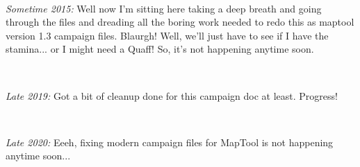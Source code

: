 \

\emph{Sometime 2015:} Well now I'm sitting here taking a deep breath and going through the files and dreading all the boring work needed to redo this as maptool version 1.3 campaign files. Blaurgh! Well, we'll just have to see if I have the stamina... or I might need a Quaff! So, it's not happening anytime soon.

\

\emph{Late 2019:} Got a bit of cleanup done for this campaign doc at least. Progress!

\

\emph{Late 2020:} Eeeh, fixing modern campaign files for MapTool is not happening anytime soon...









\clearpage              %
\flushbottom
\tableofcontents        %
\newpage                %












\raggedbottom
\thispagestyle{empty}
\clearpage










\clearpage
\setcounter{page}{1}
\flushbottom

